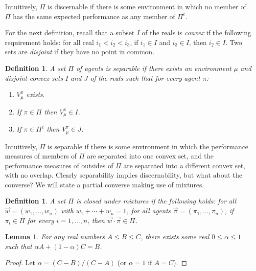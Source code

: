 \documentclass[twoside]{article}
\newtheorem{definition}[theorem]{Definition}
\newtheorem{lemma}[theorem]{Lemma}
\begin{document}
Intuitively, $\Pi$ is discernable if there is some environment in which
no member of $\Pi$ has the same expected performance as any member of $\Pi^c$.

For the next definition, recall that a subset $I$ of the reals
is \emph{convex} if the following requirement holds:
for all real $i_1<i_2<i_3$, if $i_1\in I$ and $i_3\in I$, then $i_2\in I$.
Two sets are \emph{disjoint} if they have no point in common.

\begin{definition}
\label{incentivizabilitydefn}
    A set $\Pi$ of agents is \emph{separable} if there exists
    an environment $\mu$ and disjoint convex sets $I$ and $J$ of
    the reals such that for every agent $\pi$:
    \begin{enumerate}
        \item
        $V^\pi_\mu$ exists.
        \item
        If $\pi\in \Pi$ then $V^\pi_\mu\in I$.
        \item
        If $\pi\in \Pi^c$ then $V^\pi_\mu\in J$.
    \end{enumerate}
\end{definition}

Intuitively, $\Pi$ is separable if there is some environment in which
the performance measures of members of $\Pi$ are separated into one
convex set, and the performance measures of outsides of $\Pi$ are separated
into a different convex set, with no overlap.
Clearly separability implies discernability, but what about the converse?
We will state a partial converse making use of mixtures.

\begin{definition}
\label{mixtureclosuredef}
    A set $\Pi$ is \emph{closed under mixtures} if the following
    holds: for all $\vec w=(w_1,\ldots,w_n)$
    with $w_1+\cdots+w_n=1$,
    for all agents $\vec\pi=(\pi_1,\ldots,\pi_n)$,
    if $\pi_i\in \Pi$ for every $i=1,\ldots,n$, then
    $\vec w\cdot\vec\pi\in\Pi$.
\end{definition}

\begin{lemma}
\label{ivtlemma}
    For any real numbers $A\leq B\leq C$, there exists some real $0\leq \alpha\leq 1$
    such that $\alpha A + (1-\alpha)C=B$.
\end{lemma}

\begin{proof}
    Let $\alpha=(C-B)/(C-A)$ (or $\alpha=1$ if $A=C$).
\end{proof}
\end{document}
